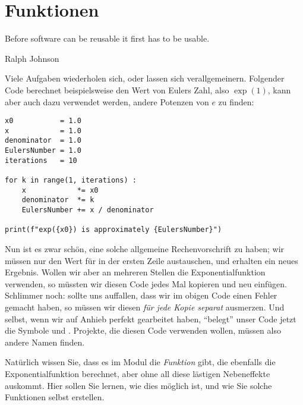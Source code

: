 \chapter{Funktionen}
\label{chp:Funcs}
\epigraph{
	Before software can be reusable it first has to be usable.
}{Ralph Johnson}

Viele Aufgaben wiederholen sich, oder lassen sich verallgemeinern. Folgender Code berechnet beispielsweise den Wert von Eulers Zahl, also $\exp(1)$, kann aber auch dazu verwendet werden, andere Potenzen von $e$ zu finden:

\begin{codebox}
\begin{verbatim}
x0           = 1.0
x            = 1.0
denominator  = 1.0
EulersNumber = 1.0
iterations   = 10

for k in range(1, iterations) :
    x            *= x0
    denominator  *= k
    EulersNumber += x / denominator

print(f"exp({x0}) is approximately {EulersNumber}")
\end{verbatim}
\end{codebox}

Nun ist es zwar schön, eine solche allgemeine Rechenvorschrift zu haben; wir müssen nur den Wert für  in der ersten Zeile austauschen, und erhalten ein neues Ergebnis. Wollen wir aber an mehreren Stellen die Exponentialfunktion verwenden, so müssten wir diesen Code jedes Mal kopieren und neu einfügen. Schlimmer noch: sollte uns auffallen, dass wir im obigen Code einen Fehler gemacht haben, so müssen wir diesen \emph{für jede Kopie separat} ausmerzen. Und selbst, wenn wir auf Anhieb perfekt gearbeitet haben, \enquote{belegt} unser Code jetzt \ua die Symbole  und . Projekte, die diesen Code verwenden wollen, müssen also andere Namen finden.

Natürlich wissen Sie, dass es im Modul  die \emph{Funktion}  gibt, die ebenfalls die Exponentialfunktion berechnet, aber ohne all diese lästigen Nebeneffekte auskommt. Hier sollen Sie lernen, wie dies möglich ist, und wie Sie solche Funktionen selbst erstellen.

